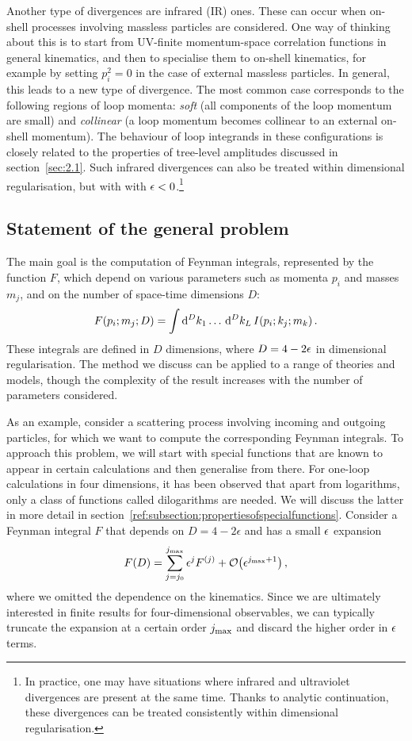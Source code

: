 Another type of divergences are infrared (IR) ones. These can occur when on-shell processes involving massless particles are considered. 
One way of thinking about this is to start from UV-finite momentum-space correlation functions in general kinematics, and then to specialise them to 
on-shell kinematics, for example by setting $p_i^2=0$ in the case of external massless particles. 
In general, this leads to a new type of divergence. The most common case corresponds to the following regions of loop momenta: \emph{soft} (all components of the loop momentum are small) and \emph{collinear} (a loop momentum becomes collinear to an external on-shell momentum).
The behaviour of loop integrands in these configurations is closely related to the properties of tree-level amplitudes discussed in section~\ref{sec:2.1}.
Such infrared divergences can also be treated within dimensional regularisation, but with with $\epsilon<0$.\footnote{In practice, one may have situations where infrared and ultraviolet divergences are present at the same time. Thanks to analytic continuation, these divergences can be treated consistently within dimensional regularisation.}

 \subsection{Statement of the general problem}
\label{subsec:genproblem}

The main goal is the computation of Feynman integrals, represented by the function $F$, which depend on various parameters such as momenta $p_i$ and masses $m_j$, and on the number of space-time dimensions $D$:
 \begin{align}
F(p_{i}; m_{j}; D ) = \int \mathrm{d}^{D}{k_1} \ldots \, \mathrm{d}^{D}{k_L} \, I(p_{i}; k_{j}; m_{k}) \,. 
\end{align}
 These integrals are defined in $D$ dimensions, where $D=4-2 \epsilon$ in dimensional regularisation. 
 The method we discuss can be applied to a range of theories and models, though the complexity of the result increases with the number of parameters considered.

As an example, consider a scattering process involving incoming and outgoing particles, for which we want to compute the corresponding Feynman integrals. To approach this problem, we will start with special functions that are known to appear in certain calculations and then generalise from there. For one-loop calculations in four dimensions, it has been observed that apart from logarithms, only a class of functions called dilogarithms are needed. We will discuss the latter in more detail in section~\ref{ref:subsection:propertiesofspecialfunctions}.
Consider a Feynman integral $F$ that depends on $D=4-2 \epsilon$ and has a small $\epsilon$ expansion 
\begin{align}
F(D) = \sum_{j = j_{0}}^{j_{\rm max}} \epsilon^{j} F^{(j)} + {\mathcal{O}}\bigl(\epsilon^{j_{\rm max}+1} \bigr) \,,
\end{align}
where we omitted the dependence on the kinematics.
Since we are ultimately interested in finite results for four-dimensional observables, we can typically truncate the expansion at a certain order $j_{\rm max}$ and discard the higher order in $\epsilon$ terms. 

